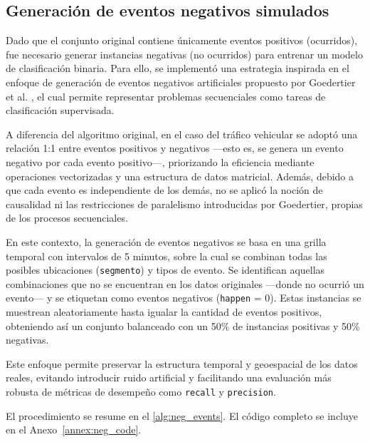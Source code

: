 \documentclass[12pt]{article}
\begin{document}
\subsection{Generación de eventos negativos simulados} \label{ssec:class_balancing}

Dado que el conjunto original contiene únicamente eventos positivos (ocurridos), fue necesario generar instancias negativas (no ocurridos) para entrenar un modelo de clasificación binaria. Para ello, se implementó una estrategia inspirada en el enfoque de generación de eventos negativos artificiales propuesto por Goedertier et al. \citep{goedertier2009robust}, el cual permite representar problemas secuenciales como tareas de clasificación supervisada.

A diferencia del algoritmo original, en el caso del tráfico vehicular se adoptó una relación 1:1 entre eventos positivos y negativos —esto es, se genera un evento negativo por cada evento positivo—, priorizando la eficiencia mediante operaciones vectorizadas y una estructura de datos matricial. Además, debido a que cada evento es independiente de los demás, no se aplicó la noción de causalidad ni las restricciones de paralelismo introducidas por Goedertier, propias de los procesos secuenciales.

En este contexto, la generación de eventos negativos se basa en una grilla temporal con intervalos de 5 minutos, sobre la cual se combinan todas las posibles ubicaciones (\texttt{segmento}) y tipos de evento. Se identifican aquellas combinaciones que no se encuentran en los datos originales —donde no ocurrió un evento— y se etiquetan como eventos negativos (\texttt{happen} = 0). Estas instancias se muestrean aleatoriamente hasta igualar la cantidad de eventos positivos, obteniendo así un conjunto balanceado con un 50\% de instancias positivas y 50\% negativas.

Este enfoque permite preservar la estructura temporal y geoespacial de los datos reales, evitando introducir ruido artificial y facilitando una evaluación más robusta de métricas de desempeño como \texttt{recall} y \texttt{precision}.

El procedimiento se resume en el \cref{alg:neg_events}. El código completo se incluye en el Anexo~\ref{annex:neg_code}.
\end{document}
